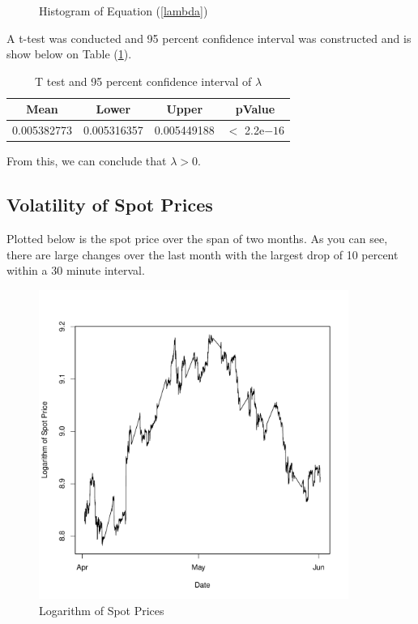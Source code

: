 \documentclass{paper}
\let\oldref\ref
\renewcommand{\ref}[1]{(\oldref{#1})}
\begin{document}
\begin{doublespacing}
\begin{figure}[H]
\begin{minipage}{0.5\textwidth}
        \caption{Histogram of Equation \ref{lambda}}\label{lamhist}
    \end{minipage}
\end{figure}
A t-test was conducted and 95 percent confidence interval was constructed and is show below on Table \ref{tlam}.
\begin{table}[H]
\centering
\begin{tabular}{| c | c  c | c |}\hline
Mean & Lower & Upper & pValue\\\hline
0.005382773 & 0.005316357 & 0.005449188 & $<$ 2.2e$-16$\\\hline
\end{tabular}
\caption{T test and 95 percent confidence interval of $\lambda$}\label{tlam}
\end{table}
From this, we can conclude that $\lambda > 0$.
\subsection{Volatility of Spot Prices}
Plotted below is the spot price over the span of two months. As you can see, there are large changes over the last month with the largest drop of 10 percent within a 30 minute interval.
\begin{figure}[H]
    \centering
    \begin{minipage}{0.5\textwidth}
        \centering
        \includegraphics[width=0.9\textwidth]{30MinTrend.pdf} %
        \caption{Logarithm of Spot Prices}\label{30trend}

\end{minipage}
\end{figure}
\end{doublespacing}
\end{document}
